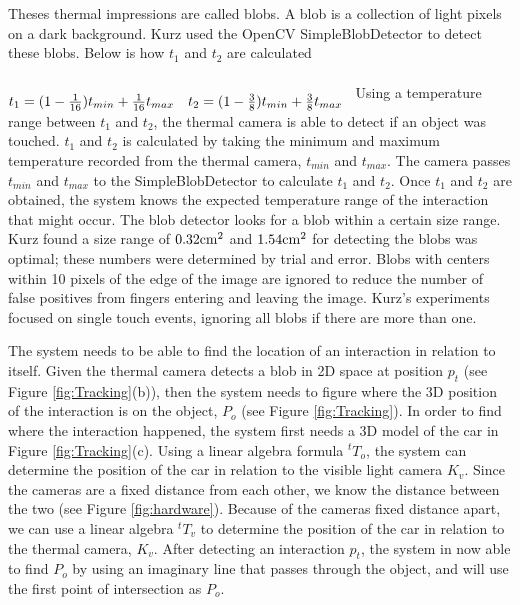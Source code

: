\documentclass{sig-alternate}
\begin{document}
Theses thermal impressions are called blobs. A blob is a collection of light pixels on a dark background. Kurz used the OpenCV SimpleBlobDetector to detect these blobs. Below is how \(t_1\) and \(t_2\) are calculated

\(
\begin{matrix} \\
 t_{1}=(1-{1\over 16})t_{ min}+{1\over 16}t_{ max} & t_{2}=(1-{3\over 8})t_{ min}+{3\over 8}t_{ max}\cr 
 \end{matrix} \\\\
\)
Using a temperature range between \(t_1\) and \(t_2\), the thermal camera is able to detect if an object was touched. \(t_1\) and \(t_2\) is calculated by taking the minimum and maximum temperature recorded from the thermal camera, \(t_{min}\) and \(t_{max}\). The camera passes \(t_{min}\) and \(t_{max}\) to the SimpleBlobDetector to calculate \(t_1\) and \(t_2\). Once \(t_1\) and \(t_2\) are obtained, the system knows the expected temperature range of the interaction that might occur. The blob detector looks for a blob within a certain size range. Kurz found a size range of \(0.32{\rm cm}^{2}\) and \(1.54{\rm cm}^{2}\) for detecting the blobs was optimal; these numbers were determined by trial and error. Blobs with centers within 10 pixels of the edge of the image are ignored to reduce the number of false positives from fingers entering and leaving the image. Kurz's experiments focused on single touch events, ignoring all blobs if there are more than one.

The system needs to be able to find the location of an interaction in relation to itself. Given the thermal camera detects a blob in 2D space at position \(p_t\) (see Figure \ref{fig:Tracking}(b)), then the system needs to figure where the 3D position of the interaction is on the object, \(P_o\) (see Figure \ref{fig:Tracking}). In order to find where the interaction happened, the system first needs a 3D model of the car in Figure \ref{fig:Tracking}(c). Using a linear algebra formula \({^t}T_o\), the system can determine the position of the car in relation to the visible light camera \(K_v\). Since the cameras are a fixed distance from each other, we know the distance between the two (see Figure \ref{fig:hardware}). Because of the cameras fixed distance apart, we can use a linear algebra \({^t}T_v\) to determine the position of the car in relation to the thermal camera, \(K_v\). After detecting an interaction \(p_t\), the system in now able to find \(P_o\) by using an imaginary line that passes through the object, and will use the first point of intersection as \(P_o\).    
 
\end{document}
